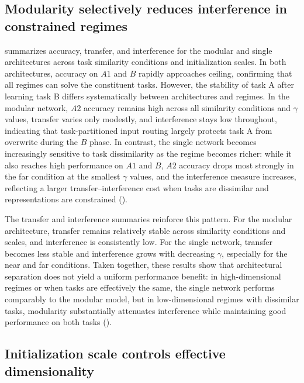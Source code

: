 \documentclass{article}
\theoremstyle{plain}
\theoremstyle{definition}
\theoremstyle{remark}
\begin{document}
\subsection{Modularity selectively reduces interference in constrained regimes}

 summarizes accuracy, transfer, and interference for the modular and single architectures across task similarity conditions and initialization scales. In both architectures, accuracy on $A1$ and $B$ rapidly approaches ceiling, confirming that all regimes can solve the constituent tasks. However, the stability of task A after learning task B differs systematically between architectures and regimes. In the modular network, $A2$ accuracy remains high across all similarity conditions and $\gamma$ values, transfer varies only modestly, and interference stays low throughout, indicating that task-partitioned input routing largely protects task A from overwrite during the $B$ phase. In contrast, the single network becomes increasingly sensitive to task dissimilarity as the regime becomes richer: while it also reaches high performance on $A1$ and $B$, $A2$ accuracy drops most strongly in the far condition at the smallest $\gamma$ values, and the interference measure increases, reflecting a larger transfer–interference cost when tasks are dissimilar and representations are constrained (). 

The transfer and interference summaries reinforce this pattern. For the modular architecture, transfer remains relatively stable across similarity conditions and scales, and interference is consistently low. For the single network, transfer becomes less stable and interference grows with decreasing $\gamma$, especially for the near and far conditions. Taken together, these results show that architectural separation does not yield a uniform performance benefit: in high-dimensional regimes or when tasks are effectively the same, the single network performs comparably to the modular model, but in low-dimensional regimes with dissimilar tasks, modularity substantially attenuates interference while maintaining good performance on both tasks ().

\subsection{Initialization scale controls effective dimensionality}
\end{document}
